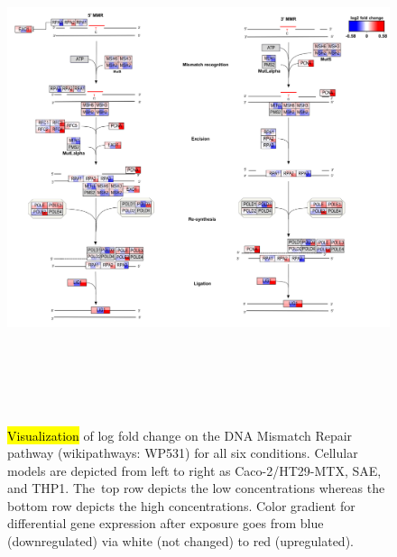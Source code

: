 \documentclass[ijms,article,accept,moreauthors,pdftex]{Definitions/mdpi}
\begin{document}
\begin{paracol}{2}
\switchcolumn

\vspace{-12pt}

\clearpage
\end{paracol}
\nointerlineskip
\begin{figure}[H]
\widefigure
\includegraphics[height=15cm]{figA3.png}
\caption{\hl{Visualization} of log fold change on the DNA Mismatch Repair pathway (wikipathways: WP531) for all six conditions.
{Cellular models} are depicted from left to right as {Caco-2/HT29-MTX}, SAE, and THP1. The~top row depicts the low concentrations whereas the bottom row depicts the high concentrations. {Color gradient for differential gene expression after exposure goes from blue (downregulated) via white (not changed) to red (upregulated).}
}
\label{fig:figA3}
\end{figure}
\end{document}
